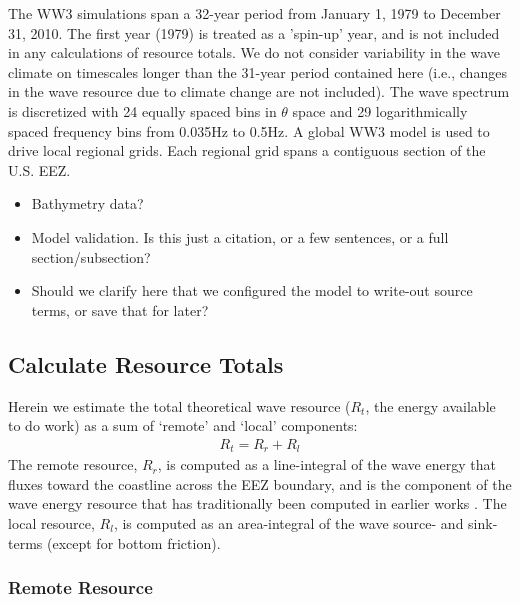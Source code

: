 The WW3 simulations span a 32-year period from January 1, 1979 to December 31, 2010. The first year (1979) is treated as a 'spin-up' year, and is not included in any calculations of resource totals. We do not consider variability in the wave climate on timescales longer than the 31-year period contained here (i.e., changes in the wave resource due to climate change are not included).
The wave spectrum is discretized with 24 equally spaced bins in $\theta$ space and 29 logarithmically spaced frequency bins from 0.035Hz to 0.5Hz. A global WW3 model is used to drive local regional grids. Each regional grid spans a contiguous section of the U.S. EEZ.

\begin{itemize}
\item Bathymetry data?
\item Model validation. Is this just a citation, or a few sentences, or a full section/subsection?
\item Should we clarify here that we configured the model to write-out source terms, or save that for later?
\end{itemize}

\subsection{Calculate Resource Totals} \label{sec:method:calc}

Herein we estimate the total theoretical wave resource ($R_t$, the energy available to do work) as a sum of `remote' and `local' components:
\begin{align}
  R_t = R_r + R_l
\end{align}
The remote resource, $R_r$, is computed as a line-integral of the wave energy that fluxes toward the coastline across the EEZ boundary, and is the component of the wave energy resource that has traditionally been computed in earlier works \citep{gunnQuantifyingGlobalWave2012,EPRIwaveresource2011}. The local resource, $R_l$, is computed as an area-integral of the wave source- and sink-terms (except for bottom friction). 

\subsubsection{Remote Resource} \label{sec:method:calc:remote}

